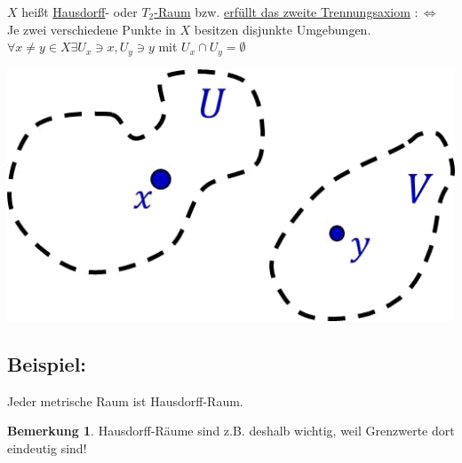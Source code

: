 \documentclass[a4paper,11pt,notitlepage]{report}
\theoremstyle{definition}
\newtheorem{remark}{Bemerkung}[chapter]
\newenvironment{bsp}[1]
{
\setlength{\fboxsep}{10pt}
\subsection*{Beispiel: #1}
\begin{upshape}
}
{
\end{upshape}
}
\newenvironment{definition}[1]{
	\begin{definitions}
	\marginnote{\emph{#1}}
}{\end{definitions}}
\begin{document}
\begin{definition}{$T_2$-Raum}
	$X$ heißt \underline{Hausdorff}- oder \underline{$T_2$-Raum} bzw. \underline{erfüllt das zweite Trennungsaxiom} $:\Leftrightarrow$ Je zwei verschiedene Punkte in $X$ besitzen disjunkte Umgebungen.
	\newline
	$\forall x \neq y \in X \exists U_x \ni x, U_y \ni y$ mit $U_x \cap U_y = \emptyset$
\begin{center}
\includegraphics[scale=0.4]{images/T2.png}
\end{center}

\end{definition}

\begin{bsp}{}
	Jeder metrische Raum ist Hausdorff-Raum.
\end{bsp}

\begin{remark}
Hausdorff-Räume sind z.B. deshalb wichtig, weil Grenzwerte dort eindeutig sind!
\end{remark}
\end{document}
